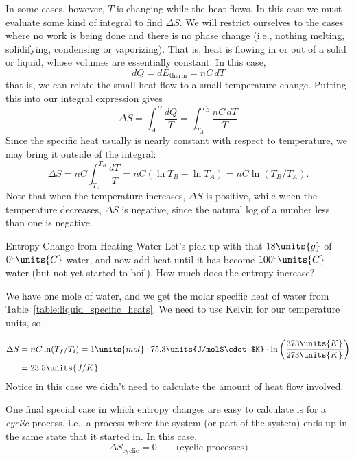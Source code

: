In some cases, however, $T$ is changing while the heat flows.  In this
case we must evaluate some kind of integral to find $\Delta S$.  We
will restrict ourselves to the cases where no work is being done and
there is no phase change (i.e., nothing melting, solidifying,
condensing or vaporizing).  That is, heat is flowing in or out of a
solid or liquid, whose volumes are essentially constant.  In this
case,
\begin{equation}
dQ = dE_\text{therm} = nC\,dT
\end{equation}
that is, we can relate the small heat flow to a small temperature
change. Putting this into our integral expression gives
\begin{equation}
\Delta S = \int_A^B \frac{dQ}{T}= \int_{T_A}^{T_B} \frac{nC\,dT}{T} 
\end{equation}
Since the specific heat usually is nearly constant with respect to
temperature, we may bring it outside of the integral:
\begin{equation}
\Delta S = nC\int_{T_A}^{T_B} \frac{dT}{T} = nC(\ln T_B -\ln T_A)
 = nC\ln(T_B/T_A).
\end{equation}
Note that when the temperature increases, $\Delta S$ is positive,
while when the temperature decreases, $\Delta S$ is negative, since
the natural log of a number less than one is negative.

\begin{example}{Entropy Change from Heating Water}
  Let's pick up with that $18\units{g}$ of $0^\circ\units{C}$ water,
  and now add heat until it has become $100^\circ\units{C}$ water (but
  not yet started to boil).  How much does the entropy increase?

  \solution We have one mole of water, and we get the molar specific
  heat of water from Table~\ref{table:liquid_specific_heats}.  We need
  to use Kelvin for our temperature units, so

\begin{align}
  \Delta S &= nC\ln(T_f/T_i) = 1\units{mol}\cdot  75.3\units{J/mol$\cdot$K}
  \cdot\ln\left(\frac{373\units{K}}{273\units{K}}\right) \nonumber\\
 &= 23.5\units{J/K}
\end{align}
Notice in this case we didn't need to calculate the amount of heat
flow involved.
\end{example}

One final special case in which entropy changes are easy to calculate
is for a {\em cyclic} process, i.e., a process where the system (or
part of the system) ends up in the same state that it started in.  In
this case,
\begin{equation}
\Delta S_\text{cyclic} = 0
\qquad\text{(cyclic processes)}
\label{eq:DeltaS_cyclic}
\end{equation}

